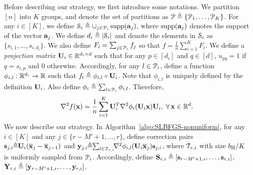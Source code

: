 \documentclass[10pt,twocolumn,journal]{IEEEtran}
\begin{document}
Before describing our strategy, we first introduce some notations. 
We partition $[n]$ into $K$ groups, %
and denote the set of partitions as $\mathcal{P}\triangleq\{\mathcal{P}_1,\ldots,\mathcal{P}_K\}$. For any $i\in[K]$, we define $\mathcal{S}_i\triangleq \cup_{j\in\mathcal{P}_i}\operatorname{supp}(\mathbf{a}_j)$, where $\operatorname{supp}(\mathbf{a}_j)$ denotes the support of the vector $\mathbf{a}_j$. %
We define $d_i\triangleq \left\lvert\mathcal{S}_i\right\rvert$ and denote the elements in $\mathcal{S}_i$ as $\{s_{i,1},\ldots,s_{i,d_i}\}$. %
We also define $F_i = \sum_{j\in\mathcal{P}_i}f_j$ so that $f = \frac{1}{n}\sum_{i=1}^K F_i$.  
We define a {\em projection matrix} %
$\mathbf{U}_i\in\mathbb{R}^{d_i\times d}$ such that for any $p\in[d_i]$ and $q\in[d]$, $u_{pq} = 1$ if $q = s_{i,p}$ and $0$ otherwise. Accordingly, for any $l\in\mathcal{P}_i$, define a function $\phi_{i,l}:\mathbb{R}^{d_i}\to\mathbb{R}$ such that $f_l\triangleq \phi_{i,l}\circ\mathbf{U}_i$. Note that $\phi_{i,l}$ is uniquely defined by the definition $\mathbf{U}_i$. Also define $\phi_i\triangleq \sum_{l\in\mathcal{P}_i}\phi_{i,l}$. 
 Therefore, %
\begin{align}
\nabla^2 f(\bx) %
= \frac{1}{n}\sum_{i=1}^K\bU_i^T\nabla^2 \phi_i(\bU_i\bx)\bU_i, \;\forall\,\bx\in\bbR^d.  \label{eq:sum_lowdim_Hess}
\end{align}
We now describe our strategy. %
In Algorithm~\ref{algo:SLBFGS-nonuniform}, for  any $i\in[K]$ and any $j\in\{r-M'+1,\ldots,r\}$, define correction pairs $\mathbf{s}_{j,i}\!\!\triangleq\!\! \mathbf{U}_i(\overline{\bf x}_{j}-\overline{\bf x}_{j-1})$ and 
$\mathbf{y}_{j,i}\!\! \triangleq\!\! \sum_{l\in\mathcal{T}_{r,i}}\!\!\nabla^2 \phi_{i,l} (\mathbf{U}_i\overline{\bf x}_j)\mathbf{s}_{j,i}$, 
where $\mathcal{T}_{r,i}$ with size $b_{\mathrm{H}}/K$ is uniformly sampled from $\mathcal{P}_i$. 
 Accordingly, define $\mathbf{S}_{r,i}\triangleq [\mathbf{s}_{r-M'+1,i},\ldots,\mathbf{s}_{r,i}]$, $\mathbf{Y}_{r,i}\triangleq [\mathbf{y}_{r-M'+1,i},\ldots,\mathbf{y}_{r,i}]$. %
\end{document}
